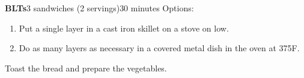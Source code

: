 \documentclass[../Cookbook.tex]{subfiles}
\begin{document}
\begin{recipe}{\textbf{BLTs}}{3 sandwiches (2 servings)}{30 minutes}
  Options:
  \begin{enumerate}
    \item Put a single layer in a cast iron skillet on a stove on low.
    \item Do as many layers as necessary in a covered metal dish in the oven at 375\0F.
  \end{enumerate}

  Toast the bread and prepare the vegetables.
\end{recipe}
\end{document}
